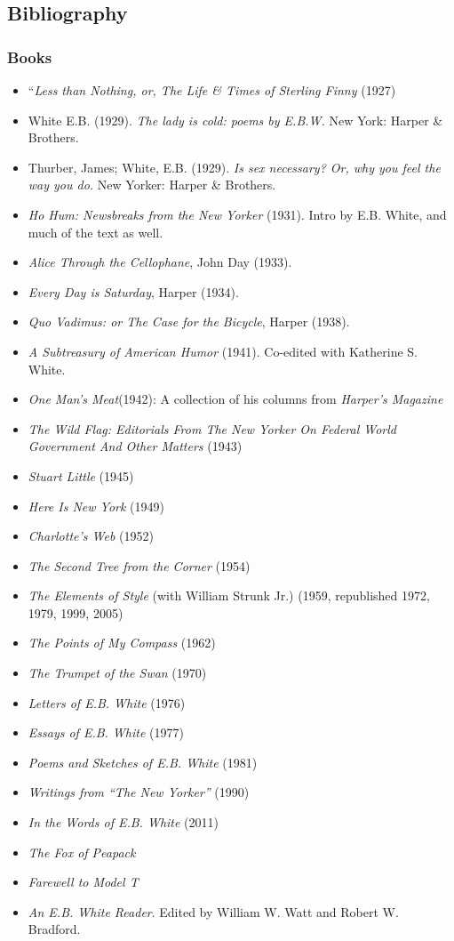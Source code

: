 \documentclass[oneside]{book}
\numberwithin{equation}{section}
\begin{document}
\subsection{Bibliography}

\subsubsection{Books}
\begin{itemize}
	\item ``\textit{Less than Nothing, or, The Life \& Times of Sterling Finny} (1927)
	\item White E.B. (1929). \textit{The lady is cold: poems by E.B.W.} New York: Harper \& Brothers.
	\item Thurber, James; White, E.B. (1929). \textit{Is sex necessary? Or, why you feel the way you do.} New Yorker: Harper \& Brothers.
	\item \textit{Ho Hum: Newsbreaks from the New Yorker} (1931). Intro by E.B. White, and much of the text as well.
	\item \textit{Alice Through the Cellophane}, John Day (1933).
	\item \textit{Every Day is Saturday}, Harper (1934).
	\item \textit{Quo Vadimus: or The Case for the Bicycle}, Harper (1938).
	\item \textit{A Subtreasury of American Humor} (1941). Co-edited with Katherine S. White.
	\item \textit{One Man's Meat}(1942): A collection of his columns from \textit{Harper's Magazine}
	\item \textit{The Wild Flag: Editorials From The New Yorker On Federal World Government And Other Matters} (1943)
	\item \textit{Stuart Little} (1945)
	\item \textit{Here Is New York} (1949)
	\item \textit{Charlotte's Web} (1952)
	\item \textit{The Second Tree from the Corner} (1954)
	\item \textit{The Elements of Style} (with William Strunk Jr.) (1959, republished 1972, 1979, 1999, 2005)
	\item \textit{The Points of My Compass} (1962)
	\item \textit{The Trumpet of the Swan} (1970)
	\item \textit{Letters of E.B. White} (1976)
	\item \textit{Essays of E.B. White} (1977)
	\item \textit{Poems and Sketches of E.B. White} (1981)
	\item \textit{Writings from ``The New Yorker''} (1990)
	\item \textit{In the Words of E.B. White} (2011)
	\item \textit{The Fox of Peapack}
	\item \textit{Farewell to Model T}
	\item \textit{An E.B. White Reader}. Edited by William W. Watt and Robert W. Bradford.
\end{itemize}
\end{document}
